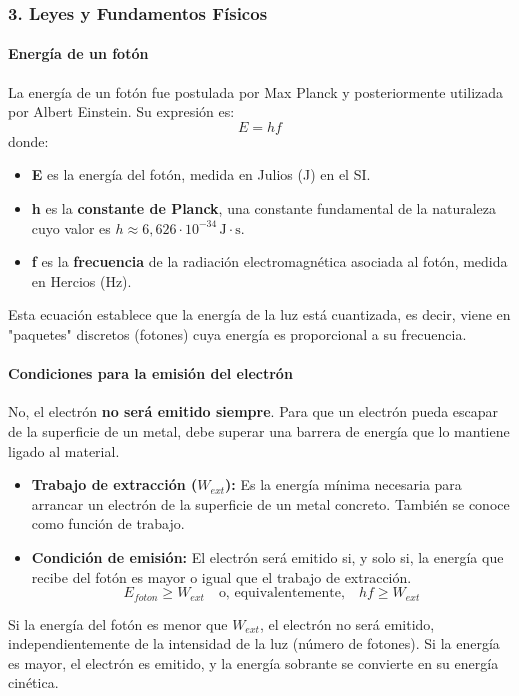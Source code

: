 \subsubsection*{3. Leyes y Fundamentos Físicos}
\paragraph{Energía de un fotón}
La energía de un fotón fue postulada por Max Planck y posteriormente utilizada por Albert Einstein. Su expresión es:
$$ E = hf $$
donde:
\begin{itemize}
    \item \textbf{E} es la energía del fotón, medida en Julios (J) en el SI.
    \item \textbf{h} es la \textbf{constante de Planck}, una constante fundamental de la naturaleza cuyo valor es $h \approx 6,626 \cdot 10^{-34}\,\text{J}\cdot\text{s}$.
    \item \textbf{f} es la \textbf{frecuencia} de la radiación electromagnética asociada al fotón, medida en Hercios (Hz).
\end{itemize}
Esta ecuación establece que la energía de la luz está cuantizada, es decir, viene en "paquetes" discretos (fotones) cuya energía es proporcional a su frecuencia.

\paragraph{Condiciones para la emisión del electrón}
No, el electrón \textbf{no será emitido siempre}. Para que un electrón pueda escapar de la superficie de un metal, debe superar una barrera de energía que lo mantiene ligado al material.
\begin{itemize}
    \item \textbf{Trabajo de extracción ($W_{ext}$):} Es la energía mínima necesaria para arrancar un electrón de la superficie de un metal concreto. También se conoce como función de trabajo.
    \item \textbf{Condición de emisión:} El electrón será emitido si, y solo si, la energía que recibe del fotón es mayor o igual que el trabajo de extracción.
    $$ E_{foton} \geq W_{ext} \quad \text{o, equivalentemente,} \quad hf \geq W_{ext} $$
\end{itemize}
Si la energía del fotón es menor que $W_{ext}$, el electrón no será emitido, independientemente de la intensidad de la luz (número de fotones). Si la energía es mayor, el electrón es emitido, y la energía sobrante se convierte en su energía cinética.

